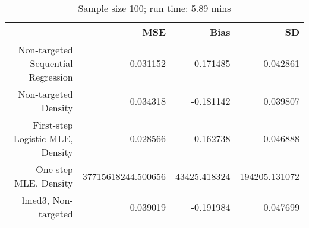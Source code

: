 \begin{table}[ht]
\centering
\caption{Sample size 100; run time: 5.89 mins} 
\begin{tabular}{rrrr}
  \hline
 & MSE & Bias & SD \\ 
  \hline
Non-targeted Sequential Regression & 0.031152 & -0.171485 & 0.042861 \\ 
  Non-targeted Density & 0.034318 & -0.181142 & 0.039807 \\ 
  First-step Logistic MLE, Density & 0.028566 & -0.162738 & 0.046888 \\ 
  One-step MLE, Density & 37715618244.500656 & 43425.418324 & 194205.131072 \\ 
  lmed3, Non-targeted & 0.039019 & -0.191984 & 0.047699 \\ 
   \hline
\end{tabular}
\end{table}
